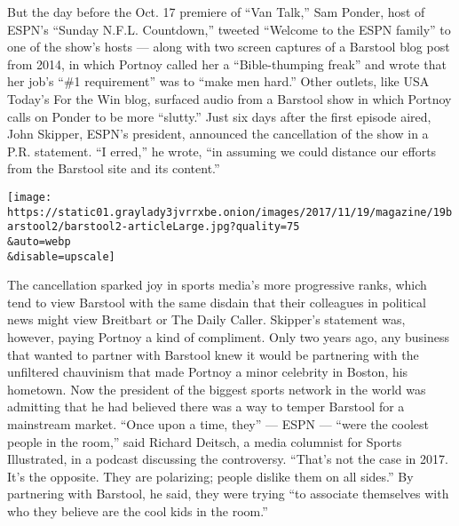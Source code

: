 But the day before the Oct. 17 premiere of ``Van Talk,'' Sam Ponder,
host of ESPN's ``Sunday N.F.L. Countdown,'' tweeted ``Welcome to the
ESPN family'' to one of the show's hosts --- along with two screen
captures of a Barstool blog post from 2014, in which Portnoy called her
a ``Bible-thumping freak'' and wrote that her job's ``\#1 requirement''
was to ``make men hard.'' Other outlets, like USA Today's For the Win
blog, surfaced audio from a Barstool show in which Portnoy calls on
Ponder to be more ``slutty.'' Just six days after the first episode
aired, John Skipper, ESPN's president, announced the cancellation of the
show in a P.R. statement. ``I erred,'' he wrote, ``in assuming we could
distance our efforts from the Barstool site and its content.''

\texttt{[image: https://static01.graylady3jvrrxbe.onion/images/2017/11/19/magazine/19barstool2/barstool2-articleLarge.jpg?quality=75\\\&auto=webp\\\&disable=upscale]}

The cancellation sparked joy in sports media's more progressive ranks,
which tend to view Barstool with the same disdain that their colleagues
in political news might view Breitbart or The Daily Caller. Skipper's
statement was, however, paying Portnoy a kind of compliment. Only two
years ago, any business that wanted to partner with Barstool knew it
would be partnering with the unfiltered chauvinism that made Portnoy a
minor celebrity in Boston, his hometown. Now the president of the
biggest sports network in the world was admitting that he had believed
there was a way to temper Barstool for a mainstream market. ``Once upon
a time, they'' --- ESPN --- ``were the coolest people in the room,''
said Richard Deitsch, a media columnist for Sports Illustrated, in a
podcast discussing the controversy. ``That's not the case in 2017. It's
the opposite. They are polarizing; people dislike them on all sides.''
By partnering with Barstool, he said, they were trying ``to associate
themselves with who they believe are the cool kids in the room.''

